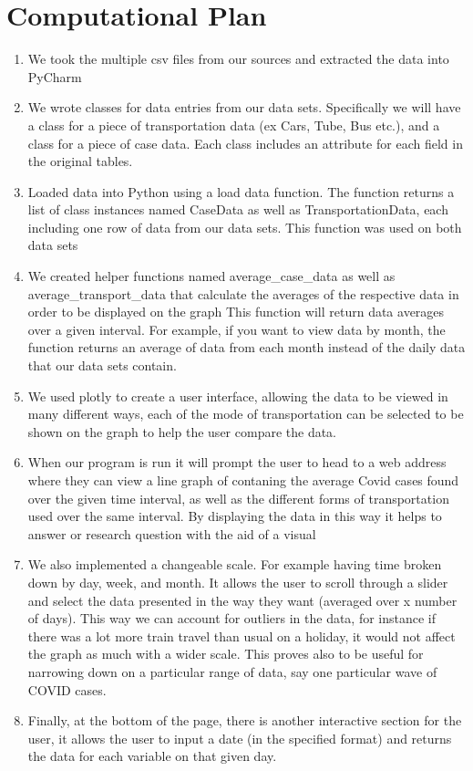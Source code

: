 \documentclass[fontsize=11pt]{article}
\begin{document}
\section*{Computational Plan}

\begin{enumerate}
    \item We took the multiple csv files from our sources and extracted the data into PyCharm
    \item We wrote classes for data entries from our data sets. Specifically we will have a class for a piece of transportation data (ex Cars, Tube, Bus etc.), and a class for a piece of case data. Each class includes an attribute for each field in the original tables.
    \item Loaded data into Python using a load data function. The function returns a list of class instances named CaseData as well as TransportationData, each including one row of data from our data sets. This function was used on both data sets
    \item We created helper functions named average\_case\_data as well as average\_transport\_data that calculate the averages of the respective data in order to be displayed on the graph This function will return data averages over a given interval. For example, if you want to view data by month, the function returns an average of data from each month instead of the daily data that our data sets contain.
    \item We used plotly to create a user interface, allowing the data to be viewed in many different ways, each of the mode of transportation can be selected to be shown on the graph to help the user compare the data.
    \item When our program is run it will prompt the user to head to a web address where they can view a line graph of contaning the average Covid cases found over the given time interval, as well as the different forms of transportation used over the same interval. By displaying the data in this way it helps to answer or research question with the aid of a visual
    \item We also implemented a changeable scale. For example having time broken down by day, week, and month. It allows the user to scroll through a slider and select the data presented in the way they want (averaged over x number of days). This way we can account for outliers in the data, for instance if there was a lot more train travel than usual on a holiday, it would not affect the graph as much with a wider scale. This proves also to be useful for narrowing down on a particular range of data, say one particular wave of COVID cases.
    \item Finally, at the bottom of the page, there is another interactive section for the user, it allows the user to input a date (in the specified format) and returns the data for each variable on that given day.
\end{enumerate}
\end{document}
